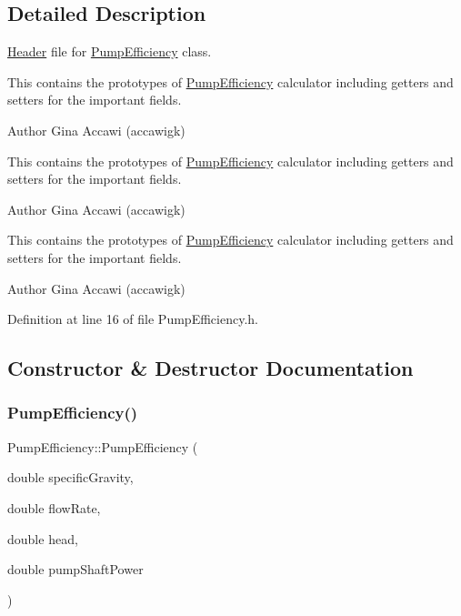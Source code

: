 \subsection{Detailed Description}
\hyperlink{class_header}{Header} file for \hyperlink{class_pump_efficiency}{Pump\+Efficiency} class. 

This contains the prototypes of \hyperlink{class_pump_efficiency}{Pump\+Efficiency} calculator including getters and setters for the important fields.

\begin{DoxyAuthor}{Author}
Gina Accawi (accawigk) 
\end{DoxyAuthor}


This contains the prototypes of \hyperlink{class_pump_efficiency}{Pump\+Efficiency} calculator including getters and setters for the important fields.

\begin{DoxyAuthor}{Author}
Gina Accawi (accawigk) 
\end{DoxyAuthor}


This contains the prototypes of \hyperlink{class_pump_efficiency}{Pump\+Efficiency} calculator including getters and setters for the important fields.

\begin{DoxyAuthor}{Author}
Gina Accawi (accawigk) 
\end{DoxyAuthor}


Definition at line 16 of file Pump\+Efficiency.\+h.



\subsection{Constructor \& Destructor Documentation}
\mbox{\label{class_pump_efficiency_abe1f431db681c3a512a7f9f11ff182cb}} 
\subsubsection{\texorpdfstring{Pump\+Efficiency()}{PumpEfficiency()}\hspace{0.1cm}{\footnotesize\ttfamily [1/3]}}
{\footnotesize\ttfamily Pump\+Efficiency\+::\+Pump\+Efficiency (\begin{DoxyParamCaption}\item[{double}]{specific\+Gravity,  }\item[{double}]{flow\+Rate,  }\item[{double}]{head,  }\item[{double}]{pump\+Shaft\+Power }\end{DoxyParamCaption})\hspace{0.3cm}{\ttfamily [inline]}}

